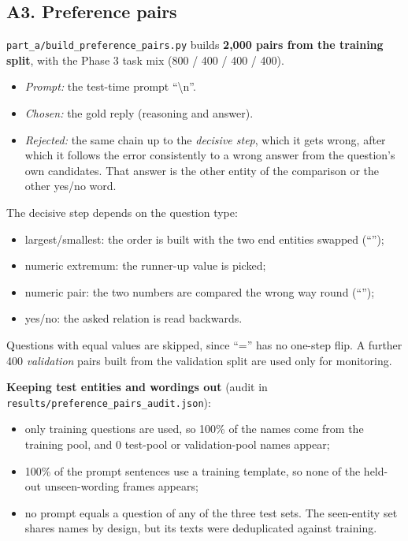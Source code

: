 \subsection*{A3. Preference pairs}
\texttt{part\_a/build\_preference\_pairs.py} builds \textbf{2,000 pairs from the training split}, with the Phase 3 task mix (800 / 400 / 400 / 400).
\begin{itemize}[leftmargin=*,nosep]
\item \emph{Prompt:} the test-time prompt ``\textbackslash n''.
\item \emph{Chosen:} the gold reply (reasoning and answer).
\item \emph{Rejected:} the same chain up to the \emph{decisive step}, which it gets wrong, after which it follows the error consistently to a wrong answer from the question's own candidates. That answer is the other entity of the comparison or the other yes/no word.
\end{itemize}
The decisive step depends on the question type:
\begin{itemize}[leftmargin=*,nosep]
\item largest/smallest: the order is built with the two end entities swapped (``'');
\item numeric extremum: the runner-up value is picked;
\item numeric pair: the two numbers are compared the wrong way round (``'');
\item yes/no: the asked relation is read backwards.
\end{itemize}
Questions with equal values are skipped, since ``='' has no one-step flip. A further 400 \emph{validation} pairs built from the validation split are used only for monitoring.

\textbf{Keeping test entities and wordings out} (audit in \texttt{results/preference\_pairs\_audit.json}):
\begin{itemize}[leftmargin=*,nosep]
\item only training questions are used, so 100\% of the names come from the training pool, and 0 test-pool or validation-pool names appear;
\item 100\% of the prompt sentences use a training template, so none of the held-out unseen-wording frames appears;
\item no prompt equals a question of any of the three test sets. The seen-entity set shares names by design, but its texts were deduplicated against training.
\end{itemize}


